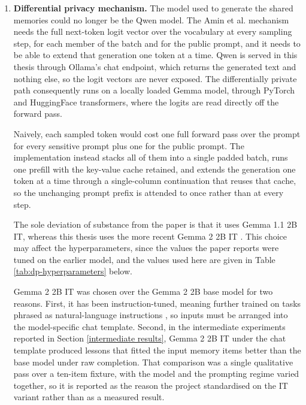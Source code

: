 \begin{enumerate}
    Ollama also releases the model from GPU memory once it has been idle for a
    while, whereas a model loaded into the runner holds that memory for as long
    as the process is alive. Since the A30s are shared across students, this
    matters.

    The same model and endpoint serve every other non-private call in the
    system: the success-or-failure judge and the memory extractor described in
    Section \ref{sec:private memory creation experiment}, and the title and
    description generation below. Only the differentially private path departs
    from it, for the reason given next.

    \item \textbf{Differential privacy mechanism.} The model used to generate
    the shared memories could no longer be the Qwen model. The Amin et al.
    mechanism needs the full next-token logit vector over the vocabulary at
    every sampling step, for each member of the batch and for the public
    prompt, and it needs to be able to extend that generation one token at a
    time. Qwen is served in this thesis through Ollama's chat endpoint, which
    returns the generated text and nothing else, so the logit vectors are never
    exposed. The differentially private path consequently runs on a locally
    loaded Gemma model, through PyTorch and HuggingFace transformers, where the
    logits are read directly off the forward pass.

    Naively, each sampled token would cost one full forward pass over the
    prompt for every sensitive prompt plus one for the public prompt. The
    implementation instead stacks all of them into a single padded batch, runs
    one prefill with the key-value cache retained, and extends the generation
    one token at a time through a single-column continuation that reuses that
    cache, so the unchanging prompt prefix is attended to once rather than at
    every step.

    The sole deviation of substance from the \citet{amin2024private} paper is
    that it uses Gemma 1.1 2B IT, whereas this thesis uses the more recent
    Gemma 2 2B IT \citep{gemmateam2024gemma2}. This choice may affect the
    hyperparameters, since the values the paper reports were tuned on the
    earlier model, and the values used here are given in Table
    \ref{tab:dp-hyperparameters} below.

    Gemma 2 2B IT was chosen over the Gemma 2 2B base model for two reasons.
    First, it has been instruction-tuned, meaning further trained on tasks
    phrased as natural-language instructions \citep{wei2022finetuned}, so
    inputs must be arranged into the model-specific chat template. Second, in
    the intermediate experiments reported in Section \ref{intermediate results},
    Gemma 2 2B IT under the chat template produced lessons that fitted the
    input memory items better than the base model under raw completion. That
    comparison was a single qualitative pass over a ten-item fixture, with the
    model and the prompting regime varied together, so it is reported as the
    reason the project standardised on the IT variant rather than as a measured
    result.


\end{enumerate}
